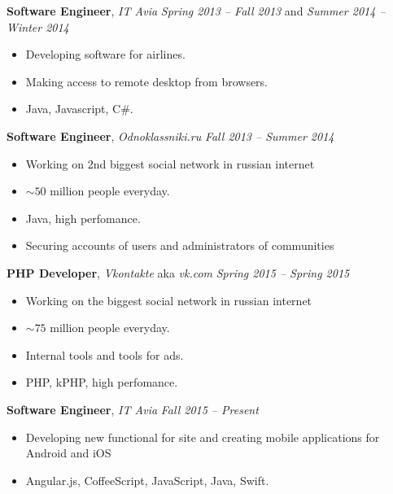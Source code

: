 \documentclass[12pt]{article}
\newenvironment{changemargin}[2]{%
  \begin{list}{}{%
    \setlength{\topsep}{0pt}%
    \setlength{\leftmargin}{#1}%
    \setlength{\rightmargin}{#2}%
    \setlength{\listparindent}{\parindent}%
    \setlength{\itemindent}{\parindent}%
    \setlength{\parsep}{\parskip}%
  }%
  \item[]}{\end{list}
}
\newenvironment{body} {
	\vspace*{-16pt}
	\begin{changemargin}{-0.25in}{-0.5in}
  }	
	{\end{changemargin}
}
\begin{document}
\begin{body}
    \vspace{14pt}
	\textbf{Software Engineer}, \emph{IT Avia} \hfill \emph{Spring 2013 -- Fall 2013} and \emph{Summer 2014 -- Winter 2014}\\
	\vspace*{-4pt}
	\begin{itemize} \itemsep -0pt  %
		\item Developing software for airlines.
		\item Making access to remote desktop from browsers.
		\item Java, Javascript, C\#.
	\end{itemize}

	\smallskip

	\vspace{14pt}
	\textbf{Software Engineer}, \emph{Odnoklassniki.ru} \hfill \emph{Fall 2013 -- Summer 2014}\\
	\vspace*{-4pt}
	\begin{itemize} \itemsep -0pt  %
		\item Working on 2nd biggest social network in russian internet
		\item $\sim50$ million people everyday.
		\item Java, high perfomance.
		\item Securing accounts of users and administrators of communities
	\end{itemize}

    \smallskip

	\vspace{14pt}
	\textbf{PHP Developer}, \emph{Vkontakte} aka \emph{vk.com} \hfill \emph{Spring 2015 -- Spring 2015}\\
	\vspace*{-4pt}
	\begin{itemize} \itemsep -0pt  %
		\item Working on the biggest social network in russian internet
		\item $\sim75$ million people everyday.
		\item Internal tools and tools for ads.
		\item PHP, kPHP, high perfomance.
	\end{itemize}
    
    \smallskip
    
    \vspace{14pt}
	\textbf{Software Engineer}, \emph{IT Avia} \hfill \emph{Fall 2015 -- Present}
	\vspace*{-4pt}
	\begin{itemize} \itemsep -0pt  %
		\item Developing new functional for site and creating mobile applications for Android and iOS 
		\item Angular.js, CoffeeScript, JavaScript, Java, Swift.
	\end{itemize}

\end{body}
\end{document}
